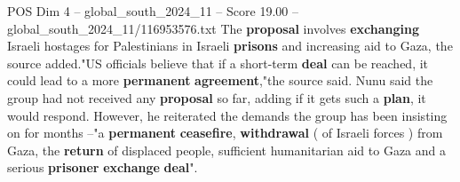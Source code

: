 \begin{textsample}{POS Dim 4 – global\_south\_2024\_11 – Score 19.00 – global\_south\_2024\_11/116953576.txt}
The \textbf{proposal} involves \textbf{exchanging} Israeli hostages for Palestinians in Israeli \textbf{prisons} and increasing aid to Gaza, the source added."US officials believe that if a short-term \textbf{deal} can be reached, it could lead to a more \textbf{permanent} \textbf{agreement},"the source said.
Nunu said the group had not received any \textbf{proposal} so far, adding if it gets such a \textbf{plan}, it would respond.
However, he reiterated the demands the group has been insisting on for months --"a \textbf{permanent} \textbf{ceasefire}, \textbf{withdrawal} ( of Israeli forces ) from Gaza, the \textbf{return} of displaced people, sufficient humanitarian aid to Gaza and a serious \textbf{prisoner} \textbf{exchange} \textbf{deal}".

\end{textsample}
